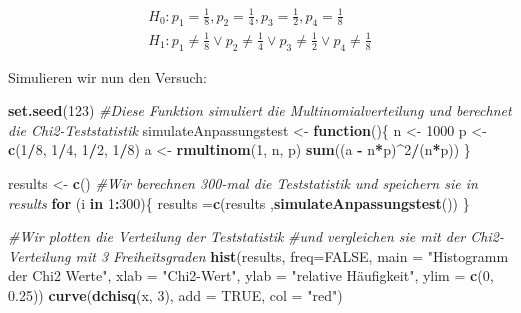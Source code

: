 \documentclass[]{article}
\newenvironment{Shaded}{\begin{snugshade}}{\end{snugshade}}
\newcommand{\CommentTok}[1]{\textcolor[rgb]{0.56,0.35,0.01}{\textit{#1}}}
\newcommand{\ControlFlowTok}[1]{\textcolor[rgb]{0.13,0.29,0.53}{\textbf{#1}}}
\newcommand{\DataTypeTok}[1]{\textcolor[rgb]{0.13,0.29,0.53}{#1}}
\newcommand{\DecValTok}[1]{\textcolor[rgb]{0.00,0.00,0.81}{#1}}
\newcommand{\FloatTok}[1]{\textcolor[rgb]{0.00,0.00,0.81}{#1}}
\newcommand{\KeywordTok}[1]{\textcolor[rgb]{0.13,0.29,0.53}{\textbf{#1}}}
\newcommand{\NormalTok}[1]{#1}
\newcommand{\OperatorTok}[1]{\textcolor[rgb]{0.81,0.36,0.00}{\textbf{#1}}}
\newcommand{\OtherTok}[1]{\textcolor[rgb]{0.56,0.35,0.01}{#1}}
\newcommand{\StringTok}[1]{\textcolor[rgb]{0.31,0.60,0.02}{#1}}
\begin{document}
\[\begin{aligned}H_0: p_1 = \frac18, p_2 = \frac14, p_3 = \frac12, p_4 = \frac18  \\
H_1: p_1 \neq \frac18 \vee p_2 \neq \frac14 \vee p_3 \neq \frac12 \vee p_4 \neq \frac18\end{aligned}\]

Simulieren wir nun den Versuch:

\begin{Shaded}
\begin{Highlighting}[]
\KeywordTok{set.seed}\NormalTok{(}\DecValTok{123}\NormalTok{)}
\CommentTok{#Diese Funktion simuliert die Multinomialverteilung und berechnet die Chi2-Teststatistik}
\NormalTok{simulateAnpassungstest <-}\StringTok{ }\ControlFlowTok{function}\NormalTok{()\{}
\NormalTok{  n <-}\StringTok{ }\DecValTok{1000}
\NormalTok{  p <-}\StringTok{ }\KeywordTok{c}\NormalTok{(}\DecValTok{1}\OperatorTok{/}\DecValTok{8}\NormalTok{, }\DecValTok{1}\OperatorTok{/}\DecValTok{4}\NormalTok{, }\DecValTok{1}\OperatorTok{/}\DecValTok{2}\NormalTok{, }\DecValTok{1}\OperatorTok{/}\DecValTok{8}\NormalTok{)}
\NormalTok{  a <-}\StringTok{ }\KeywordTok{rmultinom}\NormalTok{(}\DecValTok{1}\NormalTok{, n, p)}
  \KeywordTok{sum}\NormalTok{((a }\OperatorTok{-}\StringTok{ }\NormalTok{n}\OperatorTok{*}\NormalTok{p)}\OperatorTok{^}\DecValTok{2}\OperatorTok{/}\NormalTok{(n}\OperatorTok{*}\NormalTok{p))}
\NormalTok{\}}
\end{Highlighting}
\end{Shaded}

\begin{Shaded}
\begin{Highlighting}[]
\NormalTok{results <-}\StringTok{ }\KeywordTok{c}\NormalTok{()}
\CommentTok{#Wir berechnen 300-mal die Teststatistik und speichern sie in results}
\ControlFlowTok{for}\NormalTok{ (i }\ControlFlowTok{in} \DecValTok{1}\OperatorTok{:}\DecValTok{300}\NormalTok{)\{}
\NormalTok{  results =}\KeywordTok{c}\NormalTok{(results ,}\KeywordTok{simulateAnpassungstest}\NormalTok{())}
\NormalTok{\}}
\end{Highlighting}
\end{Shaded}

\begin{Shaded}
\begin{Highlighting}[]
\CommentTok{#Wir plotten die Verteilung der Teststatistik }
\CommentTok{#und vergleichen sie mit der Chi2-Verteilung mit 3 Freiheitsgraden}
\KeywordTok{hist}\NormalTok{(results, }\DataTypeTok{freq=}\OtherTok{FALSE}\NormalTok{, }\DataTypeTok{main =} \StringTok{"Histogramm der Chi2 Werte"}\NormalTok{, }\DataTypeTok{xlab =} \StringTok{"Chi2-Wert"}\NormalTok{,}
     \DataTypeTok{ylab =} \StringTok{"relative Häufigkeit"}\NormalTok{, }\DataTypeTok{ylim =} \KeywordTok{c}\NormalTok{(}\DecValTok{0}\NormalTok{, }\FloatTok{0.25}\NormalTok{))}
\KeywordTok{curve}\NormalTok{(}\KeywordTok{dchisq}\NormalTok{(x, }\DecValTok{3}\NormalTok{), }\DataTypeTok{add =} \OtherTok{TRUE}\NormalTok{, }\DataTypeTok{col =} \StringTok{"red"}\NormalTok{)}
\end{Highlighting}
\end{Shaded}
\end{document}
